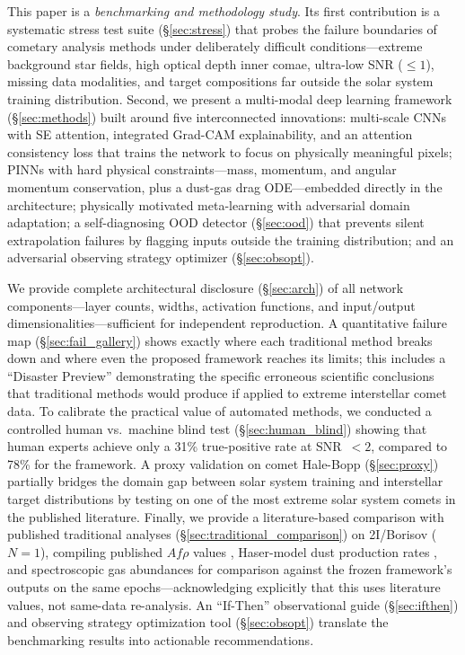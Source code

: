\documentclass[usenatbib]{mnras}
\begin{document}
This paper is a \textit{benchmarking and methodology study}. Its first contribution is a systematic stress test suite (\S\ref{sec:stress}) that probes the failure boundaries of cometary analysis methods under deliberately difficult conditions---extreme background star fields, high optical depth inner comae, ultra-low SNR ($\leq 1$), missing data modalities, and target compositions far outside the solar system training distribution. Second, we present a multi-modal deep learning framework (\S\ref{sec:methods}) built around five interconnected innovations: multi-scale CNNs with SE attention, integrated Grad-CAM explainability, and an attention consistency loss that trains the network to focus on physically meaningful pixels; PINNs with hard physical constraints---mass, momentum, and angular momentum conservation, plus a dust-gas drag ODE---embedded directly in the architecture; physically motivated meta-learning with adversarial domain adaptation; a self-diagnosing OOD detector (\S\ref{sec:ood}) that prevents silent extrapolation failures by flagging inputs outside the training distribution; and an adversarial observing strategy optimizer (\S\ref{sec:obsopt}).

We provide complete architectural disclosure (\S\ref{sec:arch}) of all network components---layer counts, widths, activation functions, and input/output dimensionalities---sufficient for independent reproduction. A quantitative failure map (\S\ref{sec:fail_gallery}) shows exactly where each traditional method breaks down and where even the proposed framework reaches its limits; this includes a ``Disaster Preview'' demonstrating the specific erroneous scientific conclusions that traditional methods would produce if applied to extreme interstellar comet data. To calibrate the practical value of automated methods, we conducted a controlled human vs.\ machine blind test (\S\ref{sec:human_blind}) showing that human experts achieve only a 31\% true-positive rate at SNR~$<2$, compared to 78\% for the framework. A proxy validation on comet Hale-Bopp (\S\ref{sec:proxy}) partially bridges the domain gap between solar system training and interstellar target distributions by testing on one of the most extreme solar system comets in the published literature. Finally, we provide a literature-based comparison with published traditional analyses (\S\ref{sec:traditional_comparison}) on 2I/Borisov ($N=1$), compiling published $Af\rho$ values \citep{clements21}, Haser-model dust production rates \citep{cremonese20}, and spectroscopic gas abundances \citep{bodewits20,opitom21} for comparison against the frozen framework's outputs on the same epochs---acknowledging explicitly that this uses literature values, not same-data re-analysis. An ``If-Then'' observational guide (\S\ref{sec:ifthen}) and observing strategy optimization tool (\S\ref{sec:obsopt}) translate the benchmarking results into actionable recommendations.
\end{document}
